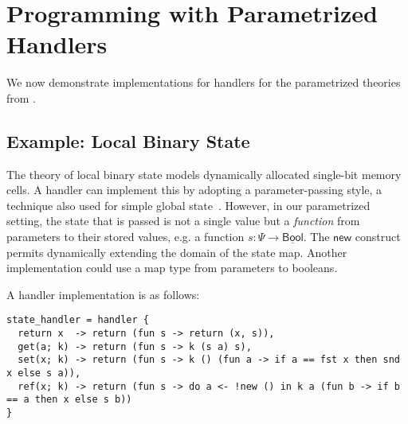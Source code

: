 \documentclass{article}
\theoremstyle{definition}
\theoremstyle{remark}
\newcommand\new{\mathsf{new}}
\newcommand\bool{\mathsf{Bool}}
\newcommand\comp[1]{\underline{#1}}
\begin{document}
\section{Programming with Parametrized Handlers}

We now demonstrate implementations for handlers for the parametrized theories from .

\subsection{Example: Local Binary State}

The theory of local binary state models dynamically allocated single-bit memory cells.
A handler can implement this by adopting a parameter-passing style, a technique also used for simple global state~\cite{pretnar_introduction_2015}.
However, in our parametrized setting, the state that is passed is not a single value but a \emph{function} from parameters to their stored values,
e.g. a function $s: \Psi \rightarrow \comp \bool$. The $\new$ construct permits dynamically extending the domain of the state map.
Another implementation could use a map type from parameters to booleans.

A handler implementation is as follows:

\begin{lstlisting}
state_handler = handler {
  return x  -> return (fun s -> return (x, s)),
  get(a; k) -> return (fun s -> k (s a) s),
  set(x; k) -> return (fun s -> k () (fun a -> if a == fst x then snd x else s a)),
  ref(x; k) -> return (fun s -> do a <- !new () in k a (fun b -> if b == a then x else s b))
}
\end{lstlisting}
\end{document}
